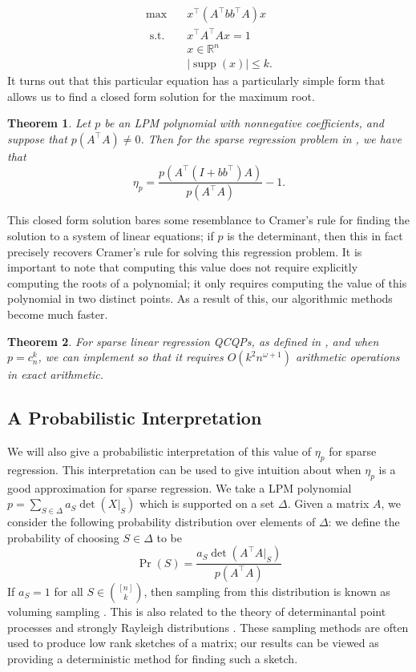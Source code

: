 \documentclass{amsart}
\newtheorem{theorem}{Theorem}[section]
\theoremstyle{definition}
\newcommand{\R}{\mathbb{R}}
\DeclareMathOperator*{\supp}{supp}
\newcommand{\st}{{\text{ s.t. }}}
\begin{document}
\begin{equation*}
\begin{aligned}
    \max\quad & x^{\intercal}(A^{\intercal}bb^{\intercal}A)x\\
    \st & x^{\intercal}A^{\intercal}Ax = 1\\
        & x \in \R^n\\
        &|\supp(x)| \le k.
\end{aligned}
\label{eq:sparse_reg}
\end{equation*}
It turns out that this particular equation has a particularly simple form that allows us to find a closed form solution for the maximum root.
\begin{theorem}
    \label{thm:sparse_reg_closed_form}
    Let $p$ be an LPM polynomial with nonnegative coefficients, and suppose that $p(A^{\intercal}A) \neq 0$.
    Then for the sparse regression problem in , we have that
    \[
        \eta_p = \frac{p(A^{\intercal} ( I + bb^{\intercal})A)}{p(A^{\intercal}A)} - 1.
    \]
\end{theorem}
This closed form solution bares some resemblance to Cramer's rule for finding the solution to a system of linear equations; if $p$ is the determinant, then this in fact precisely recovers Cramer's rule for solving this regression problem.
It is important to note that computing this value does not require explicitly computing the roots of a polynomial; it only requires computing the value of this polynomial in two distinct points.
As a result of this, our algorithmic methods become much faster.

\begin{theorem}
    \label{thm:sparse_reg_fast}
    For sparse linear regression QCQPs, as defined in , and when $p = c_n^k$, we can implement  so that it requires $O(k^2n^{\omega+1})$ arithmetic operations in exact arithmetic.
\end{theorem}

\subsection{A Probabilistic Interpretation}
\label{sec:probabilistic}
We will also give a probabilistic interpretation of this value of $\eta_p$ for sparse regression.
This interpretation can be used to give intuition about when $\eta_p$ is a good approximation for sparse regression.
We take a LPM polynomial $p = \sum_{S \in \Delta} a_S \det(X|_S)$ which is supported on a set $\Delta$.
Given a matrix $A$, we consider the following probability distribution over elements of $\Delta$: we define the probability of choosing $S \in \Delta$ to be
\[
    \Pr(S) = \frac{a_S \det(A^{\intercal}A|_S)}{p(A^{\intercal}A)}
\]
If $a_S = 1$ for all $S \in \binom{[n]}{k}$, then sampling from this distribution is known as voluming sampling \cite{deshpande2006matrix}.
This is also related to the theory of determinantal point processes and strongly Rayleigh distributions \cite{anari2016monte}.
These sampling methods are often used to produce low rank sketches of a matrix; our results can be viewed as providing a deterministic method for finding such a sketch.
\end{document}
